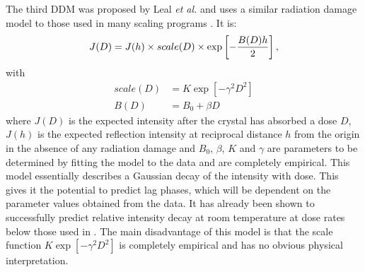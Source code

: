 The third DDM was proposed by Leal \emph{et al.} \cite{leal2012} and uses a similar radiation damage model to those used in many scaling programs \cite{evans2013,kabsch2010}. It is:
\begin{equation}
J(D) = J(h) \times scale(D) \times \exp\left[-\frac{B(D) h}{2}\right],
\label{eq:Leal DDM}
\end{equation}
with
\begin{align}
scale(D) &= K\exp\left[-\gamma^2 D^2 \right] \label{eqscale}\\
B(D)     &= B_0 + \beta D \label{eqB}
\end{align}
where $J(D)$ is the expected intensity after the crystal has absorbed a dose $D$, $J(h)$ is the expected reflection intensity at reciprocal distance $h$ from the origin in the absence of any radiation damage and $B_0$, $\beta$, $K$ and $\gamma$ are parameters to be determined by fitting the model to the data and are completely empirical.
\newline
This model essentially describes a Gaussian decay of the intensity with dose.
This gives it the potential to predict lag phases, which will be dependent on the parameter values obtained from the data.
It has already been shown to successfully predict relative intensity decay at room temperature \cite{leal2012} at dose rates below those used in \cite{owen2014}.
The main disadvantage of this model is that the scale function $K \exp\left[-\gamma^2 D^2 \right]$ is completely empirical and has no obvious physical interpretation.

